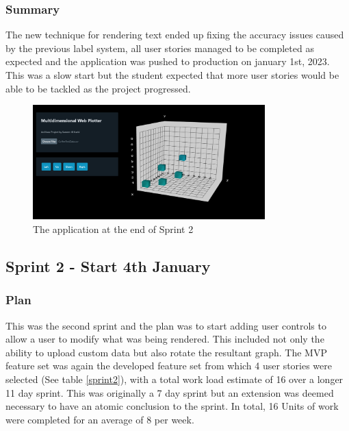 \subsubsection{Summary}
The new technique for rendering text ended up fixing the accuracy issues caused by the previous label system, all user stories managed to be completed as expected and the application was pushed to production on january 1st, 2023. This was a slow start but the student expected that more user stories would be able to be tackled as the project progressed.

\begin{figure}[h]
    \centering
    \includegraphics[width=0.8\textwidth]{author-files/figures/Pretest1progress.png}
    \caption{The application at the end of Sprint 2}
    \label{fig:sprint2end}
\end{figure}

\subsection{Sprint 2 - Start 4th January} \label{spr2}
\subsubsection{Plan}
This was the second sprint and the plan was to start adding user controls to allow a user to modify what was being rendered. This included not only the ability to upload custom data but also rotate the resultant graph. The MVP feature set was again the developed feature set from which 4 user stories were selected (See table \ref{sprint2}), with a total work load estimate of 16 over a longer 11 day sprint. This was originally a 7 day sprint but an extension was deemed necessary to have an atomic conclusion to the sprint. In total, 16 Units of work were completed for an average of 8 per week.

